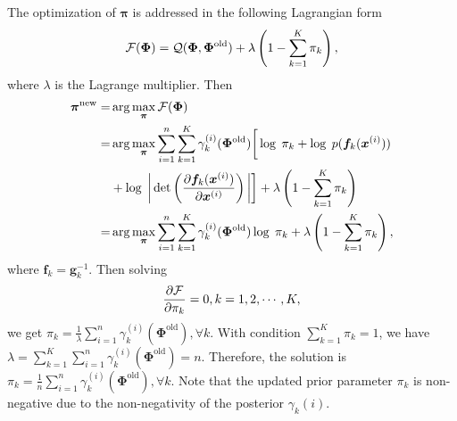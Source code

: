 
The optimization of $\bm{\pi}$ is addressed in the following Lagrangian form
\begin{equation}
  \mathcal{F}(\bm{\Phi}) = \mathcal{Q}(\bm{\Phi},\bm{\Phi}^{\mathrm{old}}) + \lambda
  \left( 1 - \sum_{k=1}^{K}\pi_k \right),
\end{equation}
where $\lambda$ is the Lagrange multiplier. Then
\begin{align}
  \bm{\pi}^{\mathrm{new}} =& \arg \max_{\bm{\pi}} \mathcal{F}(\bm{\Phi}) \nonumber\\
  =&  \arg \max_{\bm{\pi}}\sum_{i=1}^n
     \sum_{k=1}^{K}\gamma_k^{(i)}(\bm{\Phi}^{\mathrm{old}})\bigg[
     \log\;\pi_k +   \log\;p(\bm{f}_k(\bm{x}^{(i)})) \nonumber \\
                           &+ \log\;\bigg|\det\left(
                             \frac{ \partial \bm{f}_k(\bm{x}^{(i)})}{\partial \bm{x}^{(i)}}
                             \right)\bigg|\bigg] + \lambda  \left( 1 - \sum_{k=1}^{K}\pi_k \right) \nonumber\\
  =& \arg \max_{\bm{\pi}} \sum_{i=1}^n
     \sum_{k=1}^{K}\gamma_k^{(i)}(\bm{\Phi}^{\mathrm{old}})
     \log\;\pi_k+ \lambda  \left( 1 - \sum_{k=1}^{K}\pi_k \right),
\end{align}
where $\bm{f}_k = \bm{g}_k^{-1}$. Then solving
\begin{equation}
  \frac{ \partial \mathcal{F}}{\partial \pi_k} = 0, k=1, 2, \cdots, K,
\end{equation}
we get 
$
\pi_k = \frac{1}{\lambda}
\sum_{i=1}^{n}\gamma_k^{(i)}(\bm{\Phi}^{\mathrm{old}}), \forall k.
$
With condition $\sum_{k=1}^{K}\pi_k =1$, we have
$
\lambda = \sum_{k=1}^{K}\sum_{i=1}^{n}\gamma_k^{(i)}(\bm{\Phi}^{\mathrm{old}}) =n.
$
Therefore, the solution is
$
\pi_k = \frac{1}{n}
\sum_{i=1}^{n}\gamma_k^{(i)}(\bm{\Phi}^{\mathrm{old}}), \forall k.
$
Note that the updated prior parameter $\pi_k$
is non-negative due to the non-negativity of the posterior $\gamma_k{(i)}$.

